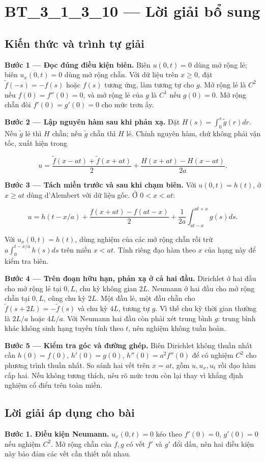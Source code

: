 \documentclass[10pt,a4paper]{article}
\begin{document}
\section*{BT\_3\_1\_3\_10 — Lời giải bổ sung}
\subsection*{Kiến thức và trình tự giải}
\textbf{Bước 1 — Đọc đúng điều kiện biên.} Biên $u(0,t)=0$ dùng mở rộng lẻ; biên $u_x(0,t)=0$ dùng mở rộng chẵn. Với dữ liệu trên $x\ge0$, đặt $\widetilde f(-s)=-f(s)$ hoặc $f(s)$ tương ứng, làm tương tự cho $g$. Mở rộng lẻ là $C^2$ nếu $f(0)=f''(0)=0$, và mở rộng lẻ của $g$ là $C^1$ nếu $g(0)=0$. Mở rộng chẵn đòi $f'(0)=g'(0)=0$ cho mức trơn ấy.

\textbf{Bước 2 — Lập nguyên hàm sau khi phản xạ.} Đặt $H(s)=\int_0^s\widetilde g(r)dr$. Nếu $\widetilde g$ lẻ thì $H$ chẵn; nếu $\widetilde g$ chẵn thì $H$ lẻ. Chính nguyên hàm, chứ không phải vận tốc, xuất hiện trong


\[
u=\frac{\widetilde f(x-at)+\widetilde f(x+at)}2+\frac{H(x+at)-H(x-at)}{2a}.
\]


\textbf{Bước 3 — Tách miền trước và sau khi chạm biên.} Với $u(0,t)=h(t)$, ở $x\ge at$ dùng d'Alembert với dữ liệu gốc. Ở $0<x<at$:


\[
u=h(t-x/a)+\frac{f(x+at)-f(at-x)}2+\frac1{2a}\int_{at-x}^{at+x}g(s)ds.
\]


Với $u_x(0,t)=h(t)$, dùng nghiệm của các mở rộng chẵn rồi trừ $a\int_0^{t-x/a}h(s)ds$ trên miền $x<at$. Tính riêng đạo hàm theo $x$ của hạng này để kiểm tra biên.

\textbf{Bước 4 — Trên đoạn hữu hạn, phản xạ ở cả hai đầu.} Dirichlet ở hai đầu cho mở rộng lẻ tại $0,L$, chu kỳ không gian $2L$. Neumann ở hai đầu cho mở rộng chẵn tại $0,L$, cũng chu kỳ $2L$. Một đầu lẻ, một đầu chẵn cho $\widetilde f(s+2L)=-\widetilde f(s)$ và chu kỳ $4L$, tương tự $g$. Vì thế chu kỳ thời gian thường là $2L/a$ hoặc $4L/a$. Với Neumann hai đầu còn phải xét trung bình $g$: trung bình khác không sinh hạng tuyến tính theo $t$, nên nghiệm không tuần hoàn.

\textbf{Bước 5 — Kiểm tra góc và đường ghép.} Biên Dirichlet không thuần nhất cần $h(0)=f(0)$, $h'(0)=g(0)$, $h''(0)=a^2f''(0)$ để có nghiệm $C^2$ cho phương trình thuần nhất. So sánh hai vết trên $x=at$, gồm $u,u_x,u_t$ rồi đạo hàm cấp hai. Nếu không tương thích, nêu rõ mức trơn còn lại thay vì khẳng định nghiệm cổ điển trên toàn miền.
\subsection*{Lời giải áp dụng cho bài}
\textbf{Bước 1. Điều kiện Neumann.} $u_x(0,t)=0$ kéo theo $f'(0)=0$, $g'(0)=0$ nếu nghiệm $C^2$. Mở rộng chẵn của $f,g$ có vết $f'$ và $g'$ đổi dấu, nên hai điều kiện này bảo đảm các vết cần thiết nối nhau.
\end{document}
